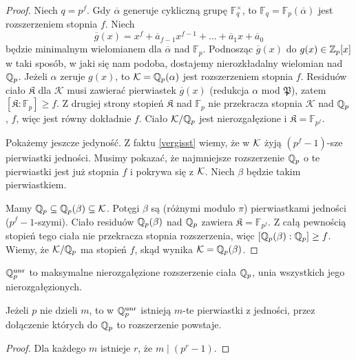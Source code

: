 \begin{proof}
	Niech $q = p^f$.
	Gdy $\overline \alpha$ generuje cykliczną grupę $\mathbb F ^\times_q$, to $\mathbb F_q = \mathbb F_p(\overline \alpha)$ jest rozszerzeniem stopnia $f$.
	Niech
	\[
		\overline g(x) = x^f + \overline{a}_{f-1} x^{f-1} + \ldots + \overline{a}_1 x + \overline{a}_0
	\]
	będzie minimalnym wielomianem dla $\overline \alpha$ nad $\mathbb F_p$.
	Podnosząc $\overline g(x)$ do $g(x) \in \mathbb Z_p[x]$ w taki sposób, w jaki się nam podoba, dostajemy nierozkładalny wielomian nad $\mathbb Q_p$.
	Jeżeli $\alpha$ zeruje $g(x)$, to $\mathcal K = \mathbb Q_p(\alpha)$ jest rozszerzeniem stopnia $f$.
	Residuów ciało $\mathfrak K$ dla $\mathcal K$ musi zawierać pierwiastek $\overline g(x)$ (redukcja $\alpha$ mod $\mathfrak P$), zatem $[\mathfrak K : \mathbb F_p] \ge f$.
	Z drugiej strony stopień $\mathfrak K$ nad $\mathbb F_p$ nie przekracza stopnia $\mathcal K$ nad $\mathbb Q_p$, $f$, więc jest równy dokładnie $f$.
	Ciało $\mathcal K / \mathbb Q_p$ jest nierozgałęzione i $\mathfrak K = \mathbb F_{p^f}$.

	Pokażemy jeszcze jedyność.
	Z faktu \ref{vergisst} wiemy, że w $\mathcal K$ żyją $(p^f-1)$-sze pierwiastki jedności.
	Musimy pokazać, że najmniejsze rozszerzenie $\mathbb Q_p$ o te pierwiastki jest już stopnia $f$ i pokrywa się z $\mathcal K$.
	Niech $\beta$ będzie takim pierwiastkiem.

	Mamy $\mathbb Q_p \subseteq \mathbb Q_p(\beta) \subseteq \mathcal K$.
	Potęgi $\beta$ są (różnymi modulo $\pi$) pierwiastkami jedności ($p^f-1$-szymi).
	Ciało residuów $\mathbb Q_p(\beta)$ nad $\mathbb Q_p$ zawiera $\mathfrak K = \mathbb F_{p^f}$.
	Z całą pewnością stopień tego ciała nie przekracza stopnia rozszerzenia, więc $[\mathbb Q_p(\beta) : \mathbb Q_p] \ge f$.
	Wiemy, że $\mathcal K / \mathbb Q_p$ ma stopień $f$, skąd wynika $\mathcal K = \mathbb Q_p(\beta)$.
\end{proof}

\begin{definicja}
	$\mathbb Q_p^{\textrm{unr}}$ to maksymalne nierozgałęzione rozszerzenie ciała $\mathbb Q_p$, unia wszystkich jego nierozgałęzionych.
\end{definicja}

\begin{fakt}
	Jeżeli $p$ nie dzieli $m$, to w $\mathbb Q_p^{\textrm{unr}}$ istnieją $m$-te pierwiastki z jedności, przez dołączenie których do $\mathbb Q_p$ to rozszerzenie powstaje.
\end{fakt}

\begin{proof}
	Dla każdego $m$ istnieje $r$, że $m \mid (p^r - 1)$.
\end{proof}

